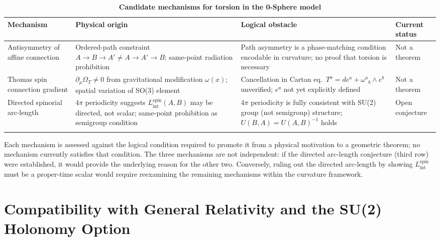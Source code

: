 \documentclass[%
 reprint,
 amsmath,amssymb,
 aps,
 prb,
]{revtex4-2}
\numberwithin{equation}{section}
\newcommand{\Lspin}{L_{\text{int}}^{\text{spin}}}
\newcommand{\omeff}{\omega(x)}
\newcommand{\OmT}{\Omega_{T}}
\begin{document}
\begin{table}[t!]
\centering
\caption{\textbf{Candidate mechanisms for torsion in the 0-Sphere model}}
\label{tab:mechanisms}
\renewcommand{\arraystretch}{1.5}
\setlength{\tabcolsep}{7pt}
\begin{tabular}{p{4.5cm}p{4.5cm}p{4.5cm}p{2.5cm}}
\toprule
\textbf{Mechanism} & \textbf{Physical origin} & \textbf{Logical obstacle} & \textbf{Current status} \\
\midrule
Antisymmetry of affine connection
& Ordered-path constraint $A\!\to\!B\!\to\!A' \neq A\!\to\!A'\!\to\!B$; same-point radiation prohibition
& Path asymmetry is a phase-matching condition encodable in curvature; no proof that torsion is necessary
& Not a theorem \\
\addlinespace[0.3cm]
Thomas spin connection gradient
& $\partial_\mu\OmT \neq 0$ from gravitational modification $\omeff$; spatial variation of SO(3) element
& Cancellation in Cartan eq.\ $T^a = de^a + \omega^a{}_b \wedge e^b$ unverified; $e^a$ not yet explicitly defined
& Not a theorem \\
\addlinespace[0.3cm]
Directed spinorial arc-length
& $4\pi$ periodicity suggests $\Lspin(A,B)$ may be directed, not scalar; same-point prohibition as semigroup condition
& $4\pi$ periodicity is fully consistent with SU(2) group (not semigroup) structure; $U(B,A) = U(A,B)^{-1}$ holds
& Open conjecture \\
\addlinespace[0.2cm]
\bottomrule
\end{tabular}
\vspace{0.2cm}
\begin{minipage}{0.95\textwidth}
\justifying\footnotesize
Each mechanism is assessed against the logical condition required to promote it from a physical motivation to a geometric theorem; no mechanism currently satisfies that condition. The three mechanisms are not independent: if the directed arc-length conjecture (third row) were established, it would provide the underlying reason for the other two. Conversely, ruling out the directed arc-length by showing $\Lspin$ must be a proper-time scalar would require reexamining the remaining mechanisms within the curvature framework.
\end{minipage}
\end{table}

\section{Compatibility with General Relativity and the SU(2) Holonomy Option}
\label{sec:gr}
\end{document}
